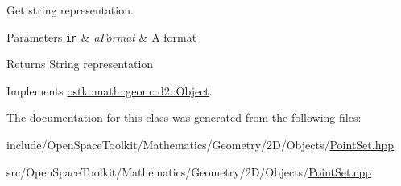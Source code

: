 Get string representation. 


\begin{DoxyParams}[1]{Parameters}
\mbox{\tt in}  & {\em a\+Format} & A format \\
\hline
\end{DoxyParams}
\begin{DoxyReturn}{Returns}
String representation 
\end{DoxyReturn}


Implements \hyperlink{classostk_1_1math_1_1geom_1_1d2_1_1_object_ada4c2187dd24ef02b91b6346191f677c}{ostk\+::math\+::geom\+::d2\+::\+Object}.



The documentation for this class was generated from the following files\+:\begin{DoxyCompactItemize}
\item 
include/\+Open\+Space\+Toolkit/\+Mathematics/\+Geometry/2\+D/\+Objects/\hyperlink{2_d_2_objects_2_point_set_8hpp}{Point\+Set.\+hpp}\item 
src/\+Open\+Space\+Toolkit/\+Mathematics/\+Geometry/2\+D/\+Objects/\hyperlink{2_d_2_objects_2_point_set_8cpp}{Point\+Set.\+cpp}\end{DoxyCompactItemize}
